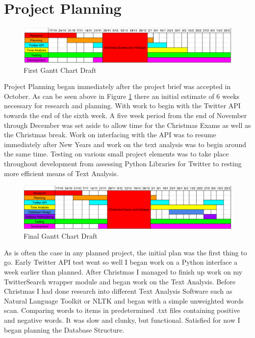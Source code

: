 \documentclass[12pt,a4paper]{report}
\begin{document}
  \section{Project Planning}
  \begin{figure}[h]
  \includegraphics[width=\textwidth]{tt1}
  \caption{First Gantt Chart Draft}
  \label{fig:tt1}
  \end{figure}
  Project Planning began immediately after the project brief was accepted in October. As can be seen above in Figure \ref{fig:tt1} there an initial estimate of 6 weeks necessary for research and planning. With work to begin with the Twitter API towards the end of the sixth week. A five week period from the end of November through December was set aside to allow time for the Christmas Exams as well as the Christmas break. Work on interfacing with the API was to resume immediately after New Years and work on the text analysis was to begin around the same time. Testing on various small project elements was to take place throughout development from assessing Python Libraries for Twitter to resting more efficient means of Text Analysis.
  \par
  \begin{figure}[h]
  \includegraphics[width=\textwidth]{tt2}
  \caption{Final Gantt Chart Draft}
  \label{fig:tt2}
  \end{figure}
  As is often the case in any planned project, the initial plan was the first thing to go. Early Twitter API test went so well I began work on a Python interface a week earlier than planned. After Christmas I managed to finish up work on my TwitterSearch\cite{TwitterSearch} wrapper module and began work on the Text Analysis. Before Christmas I had done research into different Text Analysis Software such as Natural Language Toolkit or NLTK\cite{NTLK} and began with a simple unweighted words scan. Comparing words to items in predetermined .txt files containing positive and negative words. It was slow and clunky, but functional. Satisfied for now I began planning the Database Structure.
  \clearpage
\end{document}
